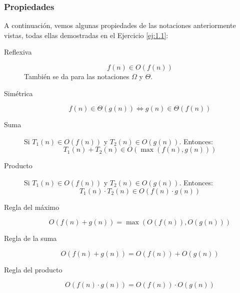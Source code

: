 \subsubsection{Propiedades}
A continuación, vemos algunas propiedades de las notaciones anteriormente vistas, todas ellas demostradas
en el Ejercicio \ref{ej:1.1}:
\begin{description}
    \item[Reflexiva]
    \begin{equation*}
    f(n) \in O(f(n))
    \end{equation*}
    También se da para las notaciones $\Omega$ y $\Theta$.

    \item [Simétrica]
    \begin{equation*}
    f(n) \in \Theta(g(n)) \Longleftrightarrow g(n) \in \Theta(f(n))
    \end{equation*}

    \item [Suma]

    Si $T_1(n) \in O(f(n))$ y $T_2(n) \in O(g(n))$. Entonces:
    \begin{equation*}
    T_1(n) + T_2(n) \in O(\max(f(n), g(n)))
    \end{equation*}

    \item [Producto]

    Si $T_1(n) \in O(f(n))$ y $T_2(n) \in O(g(n))$. Entonces:
    \begin{equation*}
    T_1(n) \cdot T_2(n) \in O(f(n) \cdot g(n))
    \end{equation*}

    \item [Regla del máximo]
    \begin{equation*}
    O(f(n)+g(n)) = \max(O(f(n)), O(g(n)))
    \end{equation*}

    \item [Regla de la suma]
    \begin{equation*}
    O(f(n)+g(n)) = O(f(n))+O(g(n))
    \end{equation*}

    \item [Regla del producto]
    \begin{equation*}
    O(f(n)\cdot g(n)) = O(f(n))\cdot O(g(n))
    \end{equation*}

\end{description}

